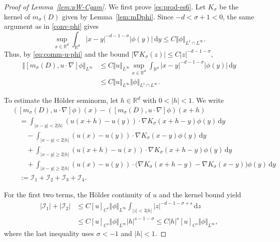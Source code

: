 \documentclass[reqno,11pt,a4paper]{amsart}
\newcommand{\R}{\ensuremath{\mathbb{R}}}
\newcommand{\dd}{\mathrm{d}}
\begin{document}
\begin{proof}[Proof of Lemma~\ref{lem:pW-Cgam}]
We first prove \eqref{es:prod-es6}.
Let $K_\sigma$ be the kernel of $m_\sigma(D)$
given by Lemma~\ref{lem:mDphi}.
Since $-d<\sigma+1<0$, the same argument
as in \eqref{conv-phi} gives
\[
  \sup_{x\in\R^d}
  \int_{\R^d}|x-y|^{-d-1-\sigma}|\phi(y)|\,\dd y
  \leq C\Vert \phi\Vert _{L^1\cap L^\infty}.
\]
Thus, by \eqref{eq:comm-u-phi} and the bound
$|\nabla K_\sigma(z)|\leq C|z|^{-d-1-\sigma}$,
\begin{equation}\label{es:convu-phi}
\begin{aligned}
  \Vert [m_\sigma(D),u\cdot\nabla]\phi\Vert _{L^\infty}
  &\leq
  C\Vert u\Vert _{L^\infty}
  \sup_{x\in\R^d}
  \int_{\R^d}|x-y|^{-d-1-\sigma}|\phi(y)|\,\dd y
  \\
  &\leq
  C\Vert u\Vert _{L^\infty}\Vert \phi\Vert _{L^1\cap L^\infty}.
\end{aligned}
\end{equation}

To estimate the H\"older seminorm, let $h\in\R^d$
with $0<|h|<1$. We write
\begin{align*}
  &([m_\sigma(D),u\cdot\nabla]\phi)(x)
  -([m_\sigma(D),u\cdot\nabla]\phi)(x+h)
  \\
  &\quad=
  \int_{|x-y|<2|h|}
  (u(x+h)-u(y))\cdot\nabla K_\sigma(x+h-y)
  \phi(y)\,\dd y
  \\
  &\qquad-
  \int_{|x-y|<2|h|}
  (u(x)-u(y))\cdot\nabla K_\sigma(x-y)
  \phi(y)\,\dd y
  \\
  &\qquad+
  \int_{|x-y|\geq2|h|}
  (u(x+h)-u(x))\cdot\nabla K_\sigma(x+h-y)
  \phi(y)\,\dd y
  \\
  &\qquad+
  \int_{|x-y|\geq2|h|}
  (u(x)-u(y))\cdot
  \bigl(\nabla K_\sigma(x+h-y)-\nabla K_\sigma(x-y)\bigr)
  \phi(y)\,\dd y
  \\
  &\quad:=\mathcal I_1+\mathcal I_2+\mathcal I_3+\mathcal I_4.
\end{align*}

For the first two terms, the H\"older continuity of $u$
and the kernel bound yield
\begin{align*}
  |\mathcal I_1|+|\mathcal I_2|
  &\leq
  C[u]_{C^s}\Vert \phi\Vert _{L^\infty}
  \int_{|z|<3|h|}|z|^{-d-1-\sigma+s}\,\dd z
  \\
  &\leq
  C[u]_{C^s}\Vert \phi\Vert _{L^\infty}
  |h|^{s-1-\sigma}
  \leq
  C|h|^s[u]_{C^s}\Vert \phi\Vert _{L^\infty},
\end{align*}
where the last inequality uses $\sigma<-1$ and $|h|<1$.


\end{proof}
\end{document}
